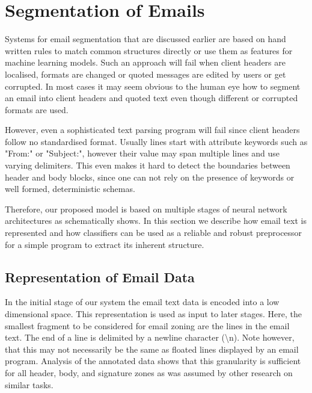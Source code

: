 \documentclass{llncs}
\begin{document}




\section{Segmentation of Emails}
\label{sec:model}
Systems for email segmentation that are discussed earlier are based on hand written rules to match common structures directly or use them as features for machine learning models.
Such an approach will fail when client headers are localised, formats are changed or quoted messages are edited by users or get corrupted.
In most cases it may seem obvious to the human eye how to segment an email into client headers and quoted text even though different or corrupted formats are used.

However, even a sophisticated text parsing program will fail since client headers follow no standardised format.
Usually lines start with attribute keywords such as "From:" or "Subject:", however their value may span multiple lines and use varying delimiters.
This even makes it hard to detect the boundaries between header and body blocks, since one can not rely on the presence of keywords or well formed, deterministic schemas.

\begin{figure}
\end{figure}

Therefore, our proposed model is based on multiple stages of neural network architectures as  schematically shows.
In this section we describe how email text is represented and how classifiers can be used as a reliable and robust preprocessor for a simple program to extract its inherent structure.

\subsection{Representation of Email Data}
In the initial stage of our system the email text data is encoded into a low dimensional space.
This representation is used as input to later stages.
Here, the smallest fragment to be considered for email zoning are the lines in the email text.
The end of a line is delimited by a newline character (\textbackslash n).
Note however, that this may not necessarily be the same as floated lines displayed by an email program.
Analysis of the annotated data shows that this granularity is sufficient for all header, body, and signature zones as was assumed by other research on similar tasks.
\end{document}
